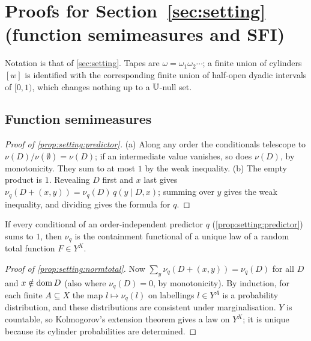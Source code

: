 \section{Proofs for Section~\ref{sec:setting} (function semimeasures and SFI)}\label{app:setting}

Notation is that of \cref{sec:setting}. Tapes are $\omega=\omega_1\omega_2\cdots$; a finite union of cylinders $[w]$ is identified with the corresponding finite union of half-open dyadic intervals of $[0,1)$, which changes nothing up to a $\mathbb{U}$-null set.

\subsection{Function semimeasures}\label{app:setting:mobius}

\begin{proof}[Proof of \cref{prop:setting:predictor}]
(a) Along any order the conditionals telescope to $\nu(D)/\nu(\emptyset)=\nu(D)$; if an intermediate value vanishes, so does $\nu(D)$, by monotonicity. They sum to at most $1$ by the weak inequality. (b) The empty product is $1$. Revealing $D$ first and $x$ last gives $\nu_q(D+(x,y))=\nu_q(D)\,q(y\mid D,x)$; summing over $y$ gives the weak inequality, and dividing gives the formula for $q$.
\end{proof}

\begin{proposition}\label{prop:setting:normtotal}
If every conditional of an order-independent predictor $q$ (\cref{prop:setting:predictor}) sums to $1$, then $\nu_q$ is the containment functional of a unique law of a random total function $F\in Y^X$.
\end{proposition}

\begin{proof}[Proof of \cref{prop:setting:normtotal}]
Now $\sum_y\nu_q(D+(x,y))=\nu_q(D)$ for all $D$ and $x\notin\operatorname{dom} D$ (also where $\nu_q(D)=0$, by monotonicity). By induction, for each finite $A\subseteq X$ the map $l\mapsto\nu_q(l)$ on labellings $l\in Y^A$ is a probability distribution, and these distributions are consistent under marginalisation. $Y$ is countable, so Kolmogorov's extension theorem gives a law on $Y^X$; it is unique because its cylinder probabilities are determined.
\end{proof}

